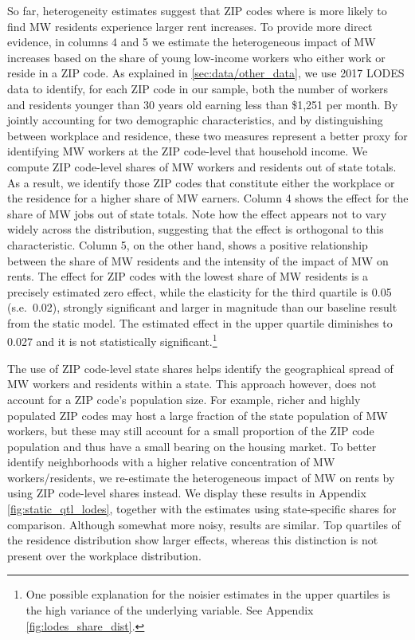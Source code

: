 So far, heterogeneity estimates suggest that ZIP codes where is more likely to find MW residents 
experience larger rent increases. To provide more direct evidence, in columns 4 and 5 we estimate 
the heterogeneous impact of MW increases based on the share of young low-income workers who 
either work or reside in a ZIP code. As explained in \autoref{sec:data/other_data}, we use 2017 
LODES data to identify, for each ZIP code in our sample, both the number of workers and residents 
younger than 30 years old earning less than \$1,251 per month.
By jointly accounting for two demographic characteristics, and by distinguishing between 
workplace and residence, these two measures represent a better proxy for identifying MW workers 
at the ZIP code-level that household income. We compute ZIP code-level shares of MW workers and 
residents out of state totals. As a result, we identify those ZIP codes that constitute either 
the workplace or the residence for a higher share of MW earners. Column 4 shows the effect for 
the share of MW jobs out of state totals. Note how the effect appears not to vary widely across 
the distribution, suggesting that the effect is orthogonal to this characteristic. Column 5, on 
the other hand, shows a positive relationship between the share of MW residents and the intensity 
of the impact of MW on rents. The effect for ZIP codes with the lowest share of MW residents is a 
precisely estimated zero effect, while the elasticity for the third quartile is 0.05 (s.e.\ 0.02), 
strongly significant and larger in magnitude than our baseline result from the static model. The 
estimated effect in the upper quartile diminishes to 0.027 and it is not statistically 
significant.\footnote{\label{ft:long_tail} One possible explanation for the noisier estimates in 
	the upper quartiles is the high variance of the underlying variable. See Appendix 
	\autoref{fig:lodes_share_dist}.}

The use of ZIP code-level state shares helps identify the geographical spread of MW workers and 
residents within a state. This approach however, does not account for a ZIP code's population 
size. For example, richer and highly populated ZIP codes may host a large fraction of the state 
population of MW workers, but these may still account for a small proportion of the ZIP code 
population and thus have a small bearing on the housing market. To better identify neighborhoods 
with a higher relative concentration of MW workers/residents, we re-estimate the heterogeneous 
impact of MW on rents by using ZIP code-level shares instead. We display these results 
in Appendix \autoref{fig:static_qtl_lodes}, together with the estimates using state-specific 
shares for comparison. Although somewhat more noisy, results are similar. Top quartiles of the 
residence distribution show larger effects, whereas this distinction is not present over the 
workplace distribution.
